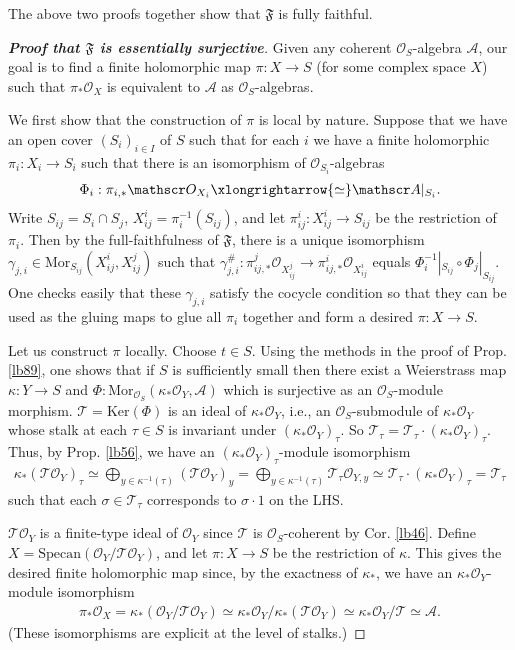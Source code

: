 \documentclass[12pt,b5paper,notitlepage]{report}
\theoremstyle{definition}
\theoremstyle{plain}
\newcommand{\fk}{\mathfrak}
\newcommand{\mc}{\mathcal}
\newcommand{\scr}{\mathscr}
\newcommand{\Ker}{\mathrm{Ker}}
\newcommand{\Specan}{\mathrm{Specan}}
\newcommand{\Mor}{\mathrm{Mor}}
\numberwithin{equation}{section}
\begin{document}
The above two proofs together show that $\fk F$ is fully faithful.


\begin{proof}[\textbf{Proof that $\fk F$ is essentially surjective}]
Given any coherent $\scr O_S$-algebra $\scr A$, our goal is to find a finite holomorphic map $\pi:X\rightarrow S$ (for some complex space $X$) such that $\pi_*\scr O_X$ is equivalent to $\scr A$ as $\scr O_S$-algebras.

We first show that the construction of $\pi$ is local by nature. Suppose that we have an open cover $(S_i)_{i\in I}$ of $S$ such that for each $i$ we have a finite holomorphic $\pi_i:X_i\rightarrow S_i$ such that there is an isomorphism of $\scr O_{S_i}$-algebras
\begin{align*}
\Phi_i:\pi_{i,*}\scr O_{X_i}\xlongrightarrow{\simeq}\scr A|_{S_i}.
\end{align*}
Write $S_{ij}=S_i\cap S_j$, $X_{ij}^i=\pi_i^{-1}(S_{ij})$, and let $\pi^i_{ij}:X^i_{ij}\rightarrow S_{ij}$ be the restriction of $\pi_i$. Then by the full-faithfulness of $\fk F$, there is a unique isomorphism $\gamma_{j,i}\in\Mor_{S_{ij}}(X_{ij}^i,X_{ij}^j)$ such that $\gamma_{j,i}^\#:\pi^j_{ij,*}\scr O_{X^j_{ij}}\rightarrow \pi^i_{ij,*}\scr O_{X^i_{ij}}$ equals $\Phi_i^{-1}|_{S_{ij}}\circ \Phi_j|_{S_{ij}}$. One checks easily that these $\gamma_{j,i}$ satisfy the cocycle condition so that they can be used as the gluing maps to glue all $\pi_i$ together and form a desired $\pi:X\rightarrow S$.

Let us construct $\pi$ locally. Choose $t\in S$. Using the methods in the proof of Prop. \ref{lb89}, one shows that if $S$ is sufficiently small then there exist a Weierstrass map $\kappa:Y\rightarrow S$ and $\Phi:\Mor_{\scr O_S}(\kappa_*\scr O_Y,\scr A)$ which is surjective as an $\scr O_S$-module morphism. $\mc T=\Ker(\Phi)$ is an ideal of $\kappa_*\scr O_Y$, i.e., an $\scr O_S$-submodule of $\kappa_*\scr O_Y$ whose stalk at each $\tau\in S$ is invariant under $(\kappa_*\scr O_Y)_\tau$. So $\mc T_\tau=\mc T_\tau\cdot (\kappa_*\scr O_Y)_\tau$. Thus, by Prop. \ref{lb56}, we have an $(\kappa_*\scr O_Y)_\tau$-module isomorphism
\begin{align*}
\kappa_*(\mc T\scr O_Y)_\tau\simeq\bigoplus_{y\in\kappa^{-1}(\tau)}(\mc T\scr O_Y)_y=\bigoplus_{y\in\kappa^{-1}(\tau)}\mc T_\tau\scr O_{Y,y}\simeq\mc T_\tau\cdot (\kappa_*\scr O_Y)_\tau= \mc T_\tau
\end{align*}
such that each $\sigma\in\mc T_\tau$ corresponds to $\sigma\cdot 1$ on the LHS.

$\mc T\scr O_Y$ is a finite-type ideal of $\scr O_Y$ since $\mc T$ is $\scr O_S$-coherent by Cor. \ref{lb46}. Define $X=\Specan(\scr O_Y/\mc T\scr O_Y)$, and let $\pi:X\rightarrow S$ be the restriction of $\kappa$. This gives the desired finite holomorphic map since, by the exactness of $\kappa_*$, we have an $\kappa_*\scr O_Y$-module isomorphism
\begin{align*}
\pi_*\scr O_X=\kappa_*(\scr O_Y/\mc T\scr O_Y)\simeq \kappa_*\scr O_Y/\kappa_*(\mc T\scr O_Y)\simeq \kappa_*\scr O_Y/\mc T\simeq\scr A.
\end{align*}
(These isomorphisms are explicit at the level of stalks.)
\end{proof}
\end{document}
